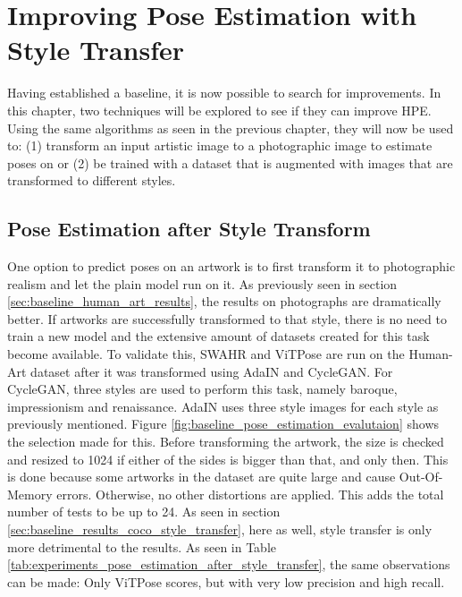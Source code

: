 \chapter{Improving Pose Estimation with Style Transfer}
\label{chap:improvements}
Having established a baseline, it is now possible to search for improvements.
In this chapter, two techniques will be explored to see if they can improve HPE.
Using the same algorithms as seen in the previous chapter, they will now be used to:
(1) transform an input artistic image to a photographic image to estimate poses on or
(2) be trained with a dataset that is augmented with images that are transformed to different styles.

\section{Pose Estimation after Style Transform}
\label{chap:improvements_style_transfer}
One option to predict poses on an artwork is to first transform it to photographic realism and let the plain model run on it.
As previously seen in section \ref{sec:baseline_human_art_results}, the results on photographs are dramatically better.
If artworks are successfully transformed to that style, there is no need to train a new model and the extensive amount of datasets created for this task become available.
To validate this, SWAHR and ViTPose are run on the Human-Art dataset after it was transformed using AdaIN and CycleGAN.
For CycleGAN, three styles are used to perform this task, namely baroque, impressionism and renaissance.
AdaIN uses three style images for each style as previously mentioned.
Figure \ref{fig:baseline_pose_estimation_evalutaion} shows the selection made for this.
Before transforming the artwork, the size is checked and resized to 1024 if either of the sides is bigger than that, and only then.
This is done because some artworks in the dataset are quite large and cause Out-Of-Memory errors.
Otherwise, no other distortions are applied.
This adds the total number of tests to be up to 24.
As seen in section \ref{sec:baseline_results_coco_style_transfer}, here as well, style transfer is only more detrimental to the results.
As seen in Table \ref{tab:experiments_pose_estimation_after_style_transfer}, the same observations can be made: Only ViTPose scores, but with very low precision and high recall.

